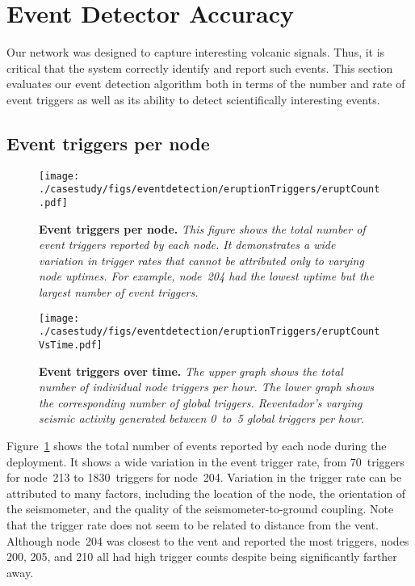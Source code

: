
\section{Event Detector Accuracy}
\label{sec-eventdetection}

Our network was designed to capture interesting volcanic signals.  Thus, it
is critical that the system correctly identify and report such events.  This
section evaluates our event detection algorithm both in terms of the number
and rate of event triggers as well as its ability to detect
scientifically interesting events.

\subsection{Event triggers per node}

\begin{figure}[t]
\begin{center}
\texttt{[image: ./casestudy/figs/eventdetection/eruptionTriggers/eruptCount.pdf]}
\end{center}
\caption{\small{\bf Event triggers per node.}
{\em This figure shows the total number of event triggers reported by each
node. It demonstrates a wide variation in trigger rates that cannot be
attributed only to varying node uptimes. For example, node~204 had the lowest
uptime but the largest number of event triggers.}}
\label{fig-eventspernode}
\end{figure}

\begin{figure}[t]
\begin{center}
\texttt{[image: ./casestudy/figs/eventdetection/eruptionTriggers/eruptCountVsTime.pdf]}
\end{center}
\caption{\small{\bf Event triggers over time.}
{\em The upper graph shows the total number of individual node triggers per
hour. The lower graph shows the corresponding number of global
triggers. Reventador's varying seismic activity generated between 0~to~5
global triggers per hour.}}
\label{fig-eventspertime}
\end{figure}

Figure~\ref{fig-eventspernode} shows the total number of events reported by
each node during the deployment. It shows a wide variation in the event
trigger rate, from 70~triggers for node~213 to 1830~triggers for node~204.
Variation in the trigger rate can be attributed to many factors, including the
location of the node, the orientation of the seismometer, and the quality of
the seismometer-to-ground coupling.  Note that the trigger rate does not seem
to be related to distance from the vent. Although node~204 was closest 
to the vent and reported the most triggers, nodes 200, 205, and 210 
all had high trigger counts despite being significantly farther away.

